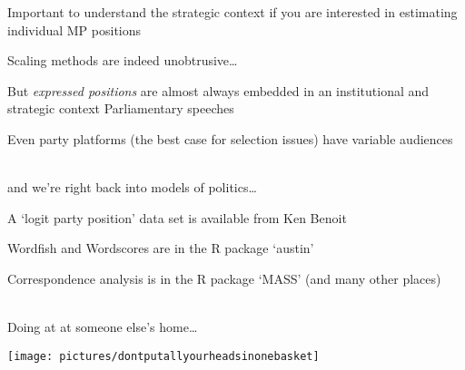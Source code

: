 \documentclass[kp]{foilpack}
\begin{document}
\itm Important to understand the strategic context if you are interested in estimating individual MP positions 
\itz




Scaling methods are indeed unobtrusive\ldots

But \textit{expressed positions} are almost always embedded in an institutional and strategic context
\ita
\itm Parliamentary speeches

\itm Even party platforms (the best case for selection issues) have variable audiences
\itz

~\\
and we're right back into models of politics\ldots 

\slide{}


A `logit party position' data set is available from Ken Benoit

Wordfish and Wordscores are in the R package `austin'

Correspondence analysis is in the R package `MASS' (and many other places)

~\\
Doing at at someone else's home\ldots



\slide{}

\centerline{\texttt{[image: pictures/dontputallyourheadsinonebasket]}}
\end{document}
